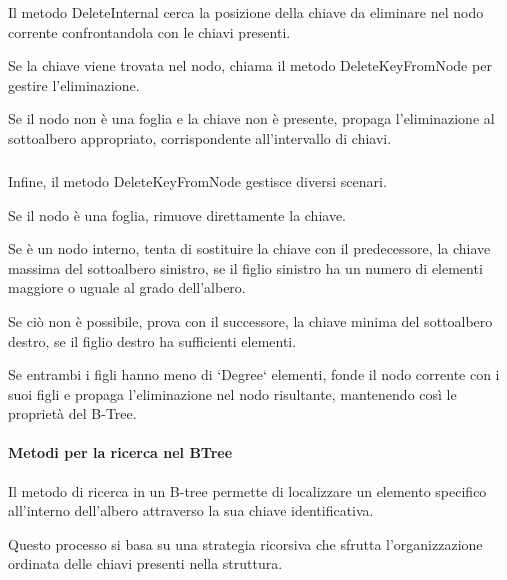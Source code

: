 \documentclass[12pt,a4paper,openright,twoside]{book}
\begin{document}
                    

                    Il metodo DeleteInternal cerca la posizione della chiave da eliminare nel nodo corrente confrontandola con le chiavi presenti.

                    Se la chiave viene trovata nel nodo, chiama il metodo DeleteKeyFromNode per gestire l'eliminazione.

                    Se il nodo non è una foglia e la chiave non è presente, propaga l'eliminazione al sottoalbero appropriato, corrispondente all'intervallo di chiavi.

                    \subparagraph*{}

                    

                    Infine, il metodo DeleteKeyFromNode gestisce diversi scenari.

                    Se il nodo è una foglia, rimuove direttamente la chiave.

                    Se è un nodo interno, tenta di sostituire la chiave con il predecessore, la chiave massima del sottoalbero sinistro, se il figlio sinistro ha un numero di elementi maggiore o uguale al grado dell'albero.

                    Se ciò non è possibile, prova con il successore, la chiave minima del sottoalbero destro, se il figlio destro ha sufficienti elementi.

                    Se entrambi i figli hanno meno di `Degree` elementi, fonde il nodo corrente con i suoi figli e propaga l'eliminazione nel nodo risultante, mantenendo così le proprietà del B-Tree.

                \paragraph{Metodi per la ricerca nel BTree}

                    

                    Il metodo di ricerca in un B-tree permette di localizzare un elemento specifico all'interno dell'albero attraverso la sua chiave identificativa.

                    Questo processo si basa su una strategia ricorsiva che sfrutta l'organizzazione ordinata delle chiavi presenti nella struttura.
\end{document}
